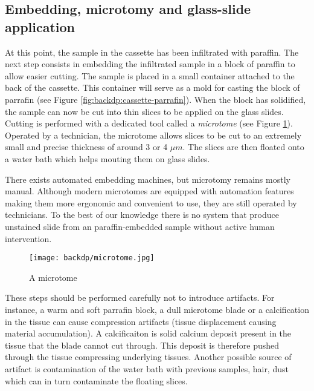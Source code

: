\subsection{Embedding, microtomy and glass-slide application}
\label{ssec:backdp:embedding}

At this point, the sample in the cassette has been infiltrated with paraffin. The next step consists in embedding the infiltrated sample in a block of paraffin to allow easier cutting. The sample is placed in a small container attached to the back of the cassette. This container will serve as a mold for casting the block of parrafin (see Figure \ref{fig:backdp:cassette-parrafin}). When the block has solidified, the sample can now be cut into thin slices to be applied on the glass slides. Cutting is performed with a dedicated tool called a \textit{microtome} (see Figure \ref{fig:backdp:microtome}). Operated by a technician, the microtome allows slices to be cut to an extremely small and precise thickness of around 3 or 4 $\mu m$. The slices are then floated onto a water bath which helps mouting them on glass slides. 

There exists automated embedding machines, but microtomy remains mostly manual. Although modern microtomes are equipped with automation features making them more ergonomic and convenient to use, they are still operated by technicians. To the best of our knowledge there is no system that produce unstained slide from an paraffin-embedded sample without active human intervention. 

\begin{figure}
  \centering
  \texttt{[image: backdp/microtome.jpg]}
  \caption{A microtome}
  \label{fig:backdp:microtome}
\end{figure}

These steps should be performed carefully not to introduce artifacts. For instance, a warm and soft parrafin block, a dull microtome blade or a calcification in the tissue can cause compression artifacts (\ie tissue displacement causing material accumulation). A calcificaiton is solid calcium deposit present in the tissue that the blade cannot cut through. This deposit is therefore pushed through the tissue compressing underlying tissues. Another possible source of artifact is contamination of the water bath with previous samples, hair, dust which can in turn contaminate the floating slices.   

